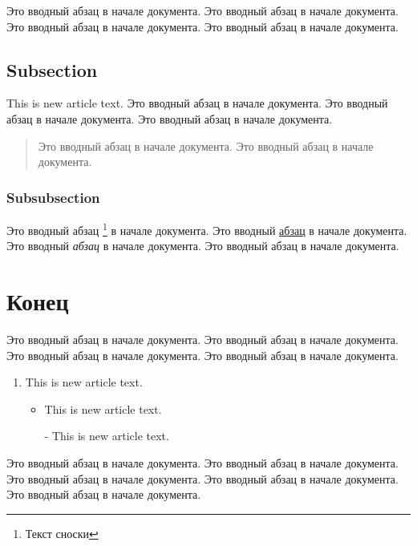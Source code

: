 \documentclass[a4paper,12pt,titlepage]{article}
\begin{document}
    Это вводный абзац в начале документа.
    Это вводный абзац в начале документа.
    Это вводный абзац в начале документа.
    Это вводный абзац в начале документа.

    \subsection{Subsection}

    This is new article text.
    Это вводный абзац в начале документа.
    Это вводный абзац в начале документа.
    Это вводный абзац в начале документа.

    \begin{quote}
        Это вводный абзац в начале документа.
        Это вводный абзац в начале документа.
    \end{quote}

    \subsubsection{Subsubsection}

    Это вводный абзац
    \footnote{ %
        Текст сноски
    }
    в начале документа.
    Это вводный \underline{абзац} в начале документа.
    Это вводный \emph{абзац} в начале документа.
    Это вводный \textsf{абзац} в начале документа.

    \section{Конец}

    Это вводный абзац в начале документа.
    Это вводный абзац в начале документа.
    Это вводный абзац в начале документа.
    Это вводный абзац в начале документа.

    \begin{enumerate}
        \item This is new article text.
        \begin{itemize}
            \item This is new article text.
            \item[-] This is new article text.
        \end{itemize}
    \end{enumerate}

    Это вводный абзац в начале документа.
    Это вводный абзац в начале документа.
    Это вводный абзац в начале документа.
    Это вводный абзац в начале документа.
    Это вводный абзац в начале документа.

    \newpage
    \tableofcontents
\end{document}
